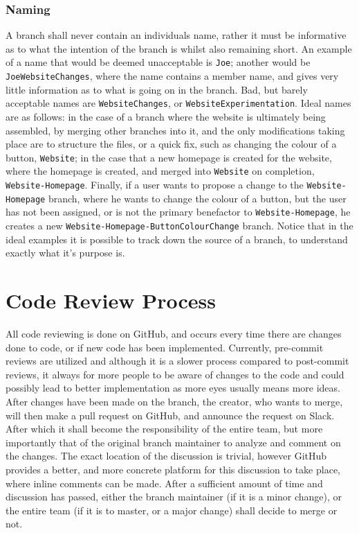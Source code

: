 \documentclass[12pt]{article}
\begin{document}
  \subsubsection{Naming}
  \flushleft
  A branch shall never contain an individuals name, rather it must be informative as to what the intention of the branch is whilst also remaining short. An example of a  name that would be deemed unacceptable is \texttt{Joe}; another would be \texttt{JoeWebsiteChanges}, where the name contains a member name, and gives very little information as to what is going on in the branch. Bad, but barely acceptable names are \texttt{WebsiteChanges}, or \texttt{WebsiteExperimentation}. Ideal names are as follows: in the case of a branch where the website is ultimately being assembled, by merging other branches into it, and the only modifications taking place are to structure the files, or a quick fix, such as changing the colour of a button, \texttt{Website}; in the case that a new homepage is created for the website, where the homepage is created, and merged into \texttt{Website} on completion, \texttt{Website-Homepage}. Finally, if a user wants to propose a change to the \texttt{Website-Homepage} branch, where he wants to change the colour of a button, but the user has not been assigned, or is not the primary benefactor to \texttt{Website-Homepage}, he creates a new \texttt{Website-Homepage-ButtonColourChange} branch. Notice that in the ideal examples it is possible to track down the source of a branch, to understand exactly what it's purpose is.

  \newpage
  \center\section{Code Review Process}
  \flushleft
All code reviewing is done on GitHub, and occurs every time there are changes done to code, or if new code has been implemented. Currently, pre-commit reviews are utilized and although it is a slower process compared to post-commit reviews, it always for more people to be aware of changes to the code and could possibly lead to better implementation as more eyes usually means more ideas. \newline
After changes have been made on the branch, the creator, who wants to merge, will then make a pull request on GitHub, and announce the request on Slack. After which it shall become the responsibility of the entire team, but more importantly that of the original branch maintainer to analyze and comment on the changes. The exact location of the discussion is trivial, however GitHub provides a better, and more concrete platform for this discussion to take place, where inline comments can be made. After a sufficient amount of time and discussion has passed, either the branch maintainer (if it is a minor change), or the entire team (if it is to master, or a major change) shall decide to merge or not.
\end{document}
